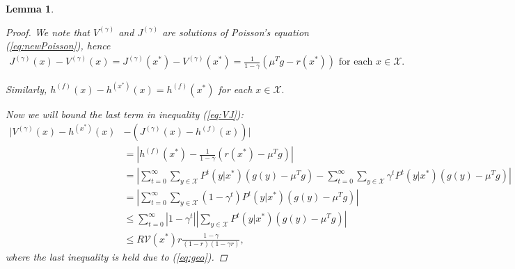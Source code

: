 \documentclass[11pt]{article}
\newcommand{\X}{\mathcal{X}}
\newcommand{\V}{\mathcal{V}}
\newtheorem{lemma}{Lemma}
\theoremstyle{definition}
\numberwithin{equation}{section}
\begin{document}
\begin{lemma}
\begin{proof}
 We note that $V^{(\gamma)}$ and $J^{(\gamma)}$ are solutions of Poisson's equation (\ref{eq:newPoisson}), hence
\begin{align*}
J^{(\gamma)}(x) - V^{(\gamma)}(x) =J^{(\gamma)}(x^*) - V^{(\gamma)}(x^*) = \frac{1}{1-\gamma}(\mu^T g - r(x^*)) \text{ for each }x\in \X.
\end{align*}

Similarly, $ h^{(f)}(x) - h^{(x^*)}(x) = h^{(f)}(x^*)$ for each $x\in \X.$

Now we will bound the last term in inequality (\ref{eq:VJ}):
\begin{align*}
\Big|V^{(\gamma)}(x) - h^{(x^*)}(x) & - \left(J^{(\gamma)}(x) - h^{(f)}(x)\right)\Big|\\
&=\left|h^{(f)}(x^*) - \frac{1}{1-\gamma}(r(x^*)-\mu^T g ) \right|\\
&=\left| \sum\limits_{t=0}^{\infty}\sum\limits_{y\in \X} P^t(y|x^*)(g(y)-\mu^Tg) - \sum\limits_{t=0}^{\infty}\sum\limits_{y\in \X}  \gamma^tP^t(y|x^*)(g(y)-\mu^Tg)  \right|\\
&=\left|  \sum\limits_{t=0}^{\infty}\sum\limits_{y\in \X}  (1-\gamma^t) P^t(y|x^*)(g(y)-\mu^Tg) \right|\\
&\leq    \sum\limits_{t=0}^{\infty} |1-\gamma^t| \left|\sum\limits_{y\in \X} P^t(y|x^*)(g(y)-\mu^Tg) \right|  \\
&\leq R\V(x^*)r\frac{1-\gamma}{(1-r)(1-\gamma r) },
\end{align*}
where the last inequality is held due to (\ref{eq:geo}).
\end{proof}
\end{lemma}
\end{document}
